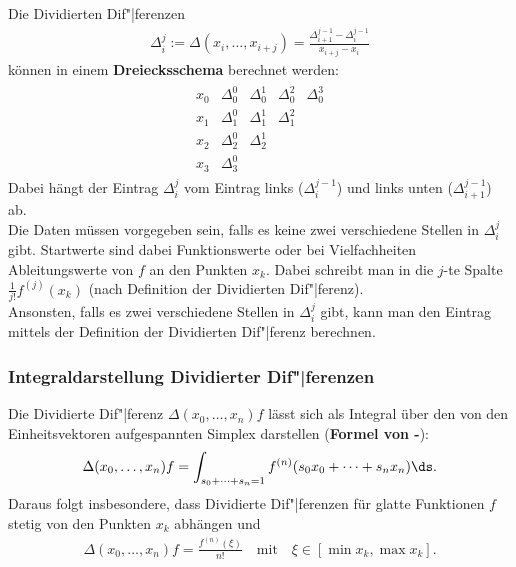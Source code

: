 Die Dividierten Dif"|ferenzen
\begin{align*}
    \Delta_i^j := \Delta(x_i, \dotsc, x_{i+j})
    = \frac{\Delta_{i+1}^{j-1} - \Delta_i^{j-1}}{x_{i+j} - x_i}
\end{align*}
können in einem \textbf{Dreiecksschema} berechnet werden:
\begin{align*}
    \begin{array}{c||cccc}
        x_0 & \Delta_0^0 & \Delta_0^1 & \Delta_0^2 & \Delta_0^3 \\
        x_1 & \Delta_1^0 & \Delta_1^1 & \Delta_1^2 \\
        x_2 & \Delta_2^0 & \Delta_2^1 \\
        x_3 & \Delta_3^0
    \end{array}
\end{align*}
Dabei hängt der Eintrag $\Delta_i^j$ vom Eintrag links ($\Delta_i^{j-1}$) und
links unten ($\Delta_{i+1}^{j-1}$) ab. \\
Die Daten müssen vorgegeben sein, falls es keine zwei verschiedene Stellen
in $\Delta_i^j$ gibt.
Startwerte sind dabei Funktionswerte oder bei Vielfachheiten Ableitungswerte
von $f$ an den Punkten $x_k$.
Dabei schreibt man in die $j$-te Spalte $\frac{1}{j!} f^{(j)}(x_k)$
(nach Definition der Dividierten Dif"|ferenz). \\
Ansonsten, falls es zwei verschiedene Stellen in $\Delta_i^j$ gibt, kann man
den Eintrag mittels der Definition der Dividierten Dif"|ferenz berechnen.

\subsubsection{%
    Integraldarstellung Dividierter Dif"|ferenzen%
}

Die Dividierte Dif"|ferenz $\Delta(x_0, \dotsc, x_n)f$ lässt sich als
Integral über den von den Einheitsvektoren aufgespannten Simplex
darstellen (\textbf{Formel von -}):
\begin{align*}
    \Delta(x_0, \dotsc, x_n)f
    = \int_{s_0 + \dotsb + s_n = 1} f^{(n)}(s_0 x_0 + \dotsb + s_n x_n)\ds.
\end{align*}
Daraus folgt insbesondere, dass Dividierte Dif"|ferenzen für glatte Funktionen
$f$ stetig von den Punkten $x_k$ abhängen und
\begin{align*}
    \Delta(x_0, \dotsc, x_n)f = \frac{f^{(n)}(\xi)}{n!} \quad\text{mit}\quad
    \xi \in [\min x_k, \max x_k].
\end{align*}

